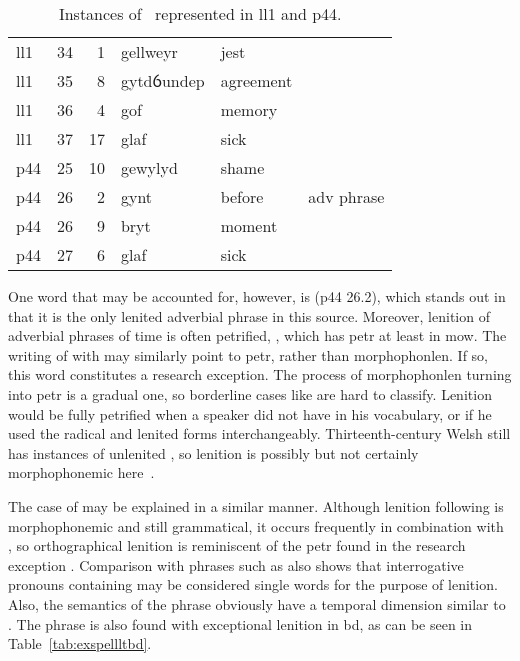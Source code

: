 \begin{table}[h]
  \centering
  \caption{Instances of \lT\ represented in \acrshort{ll1} and \acrshort{p44}.}
  \label{tab:ltrepll1p44}
  \begin{tabular}{lddwql}
    \toprule
     &  &  &  &  &  \\
    \midrule
    \acrshort{ll1} & 34 & 1 & gellweyr & jest &  \\
    \acrshort{ll1} & 35 & 8 & gytdỽundep & agreement &  \\
    \acrshort{ll1} & 36 & 4 & gof & memory &  \\
    \acrshort{ll1} & 37 & 17 & glaf & sick &  \\
    \acrshort{p44} & 25 & 10 & gewylyd & shame &  \\
    \acrshort{p44} & 26 & 2 & gynt & before & adv phrase \\
    \acrshort{p44} & 26 & 9 & bryt & moment &  \\
    \acrshort{p44} & 27 & 6 & glaf & sick &  \\
    \bottomrule
  \end{tabular}%
\end{table}

One word that may be accounted for, however, is  (\gls{p44} 26.2), which stands out in that it is the only lenited adverbial phrase in this source.
Moreover, lenition of adverbial phrases of time is often petrified, \eg {}, which has \gls{petr} at least in \gls{mow}.
The writing of  with  may similarly point to \gls{petr}, rather than \gls{morphophonlen}.
If so, this word constitutes a research exception. The process of \gls{morphophonlen} turning into \gls{petr} is a gradual one, so borderline cases like  are hard to classify. Lenition would be fully petrified when a speaker did not have  in his vocabulary, or if he used the radical and lenited forms interchangeably. Thirteenth-century Welsh still has instances of unlenited , so lenition is possibly but not certainly morphophonemic here~\autocite[s.v.~]{bevan_geiriadur_2014}.

The case of  may be explained in a similar manner.
Although lenition following  is morphophonemic and still grammatical, it occurs frequently in combination with , so orthographical lenition is reminiscent of the \gls{petr} found in the research exception .
Comparison with phrases  such as  also shows that interrogative pronouns containing  may be considered single words for the purpose of lenition.
Also, the semantics of the phrase obviously have a temporal dimension similar to .
The phrase  is also found with exceptional lenition in \gls{bd}, as can be seen in Table~\ref{tab:exspellltbd}.

